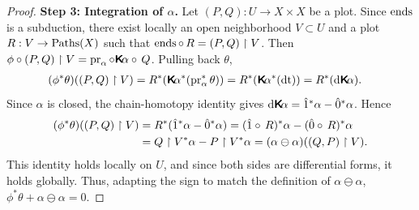 \documentclass[10pt,reqno,letterpaper,twoside]{amsbook}
\begin{document}
\begin{proof}
    \textbf{Step 3: Integration of\/ $\alpha$.}
    Let $(P,Q): U \to X \times X$ be a plot.
    Since $\operatorname{ends}$ is a subduction,
    there exist locally an open neighborhood $V \subset U$ and a plot
    $R: V \to \operatorname{Paths}(X)$ such that $\operatorname{ends} \circ\, R = (P,Q)\restriction V$.
    Then $\phi \circ (P,Q)\restriction V = \Proj_\alpha \circ \Kalpha \circ\, Q$.
    Pulling back $\theta$,
    \begin{align*}
      (\phi^*\theta)((P,Q)\restriction V)
      &= R^*(\Kalpha^*(\Proj_\alpha^*\theta))
      = R^*(\Kalpha^*(\dt))
      = R^*(\der\Kalpha).
    \end{align*}
    Since $\alpha$ is closed,
    the chain-homotopy identity gives $\mathrm{d}\boldsymbol{\mathsf{K}}\!\alpha = \hat 1^*\alpha - \hat 0^*\alpha$.
    Hence
    \begin{align*}
      (\phi^*\theta)((P,Q)\restriction V)
      &= R^*(\hat 1^*\alpha - \hat 0^*\alpha)
      = (\hat 1 \circ\, R)^*\alpha - (\hat 0 \circ\, R)^*\alpha \\
      &= Q\restriction V^*\alpha - P\restriction V^*\alpha
      = (\alpha \ominus \alpha)((Q,P)\restriction V).
    \end{align*}
    This identity holds locally on $U$,
    and since both sides are differential forms,
    it holds globally.
    Thus,
    adapting the sign to match the definition of $\alpha \ominus \alpha$,
    $\phi^*\theta + \alpha \ominus \alpha = 0$.
  \end{proof}
  
\end{document}
